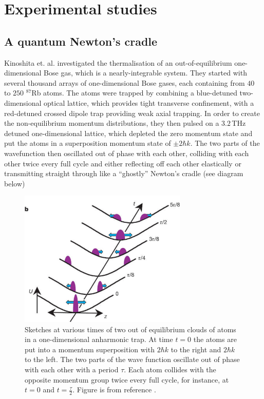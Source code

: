\documentclass[a4paper, 10pt]{article}
\theoremstyle{plain}
\begin{document}
\section{Experimental studies}

\subsection{A quantum Newton's cradle}

Kinoshita et. al. investigated \cite{Kinoshita2006} the thermalisation of an
out-of-equilibrium one-dimensional Bose gas, which is a  nearly-integrable
system. They started with several thousand arrays of one-dimensional Bose gases,
each containing from $40$ to $250$ $^{87}$Rb atoms. The atoms were trapped by
combining a blue-detuned  two-dimensional optical lattice,
which provides tight transverse confinement, with a red-detuned crossed dipole
trap providing weak axial trapping. In order to create the non-equilibrium
momentum distributions, they then pulsed on a $3.2$\,THz detuned one-dimensional
lattice, which depleted the zero momentum state and put the atoms in a
superposition momentum state of $\pm2\hbar k$. The two parts of the wavefunction
then oscillated out of phase with each other, colliding with each other twice
every full cycle and either reflecting off each other elastically or
transmitting straight through like a ``ghostly'' Newton's cradle (see diagram
below)
\begin{figure}[H]
    \begin{center}
        \includegraphics[width=8cm]{quantum_newtons_cradle}
    \end{center}
    \caption{Sketches at various times of two out of equilibrium clouds of atoms
             in a one-dimensional anharmonic trap. At time $t=0$ the atoms are
             put into a momentum superposition with $2\hbar k$ to the right and
             $2 \hbar k$ to the left. The two parts of the wave function
             oscillate out of phase with each other with a period $\tau$. Each
             atom collides with the opposite momentum group twice every full
             cycle, for instance, at $t=0$ and $t = \frac{\tau}{2}$. Figure is
             from reference \cite{Kinoshita2006}.}
\end{figure}
\end{document}
